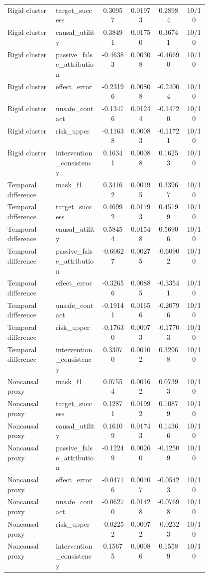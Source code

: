 \documentclass{article}
\begin{document}
\begin{center}
\begin{longtable}{p{0.24\linewidth}p{0.23\linewidth}cccc}
Rigid cluster & target\_success & 0.30957 & 0.01973 & 0.28984 & 10/10\\
Rigid cluster & causal\_utility & 0.38491 & 0.01750 & 0.36741 & 10/10\\
Rigid cluster & passive\_false\_attribution & -0.46383 & 0.00308 & -0.46690 & 10/10\\
Rigid cluster & effect\_error & -0.23196 & 0.00808 & -0.24004 & 10/10\\
Rigid cluster & unsafe\_contact & -0.13476 & 0.01244 & -0.14720 & 10/10\\
Rigid cluster & risk\_upper & -0.11638 & 0.00083 & -0.11721 & 10/10\\
Rigid cluster & intervention\_consistency & 0.16341 & 0.00088 & 0.16253 & 10/10\\
Temporal difference & mask\_f1 & 0.34162 & 0.00195 & 0.33967 & 10/10\\
Temporal difference & target\_success & 0.46992 & 0.01793 & 0.45199 & 10/10\\
Temporal difference & causal\_utility & 0.58454 & 0.01548 & 0.56906 & 10/10\\
Temporal difference & passive\_false\_attribution & -0.60627 & 0.00275 & -0.60902 & 10/10\\
Temporal difference & effect\_error & -0.32656 & 0.00885 & -0.33541 & 10/10\\
Temporal difference & unsafe\_contact & -0.19141 & 0.01656 & -0.20796 & 10/10\\
Temporal difference & risk\_upper & -0.17630 & 0.00073 & -0.17703 & 10/10\\
Temporal difference & intervention\_consistency & 0.33070 & 0.00102 & 0.32968 & 10/10\\
Noncausal proxy & mask\_f1 & 0.07554 & 0.00162 & 0.07393 & 10/10\\
Noncausal proxy & target\_success & 0.12871 & 0.01992 & 0.10879 & 10/10\\
Noncausal proxy & causal\_utility & 0.16109 & 0.01743 & 0.14366 & 10/10\\
Noncausal proxy & passive\_false\_attribution & -0.12249 & 0.00260 & -0.12509 & 10/10\\
Noncausal proxy & effect\_error & -0.04716 & 0.00707 & -0.05423 & 10/10\\
Noncausal proxy & unsafe\_contact & -0.06270 & 0.01428 & -0.07698 & 10/10\\
Noncausal proxy & risk\_upper & -0.02252 & 0.00072 & -0.02323 & 10/10\\
Noncausal proxy & intervention\_consistency & 0.15675 & 0.00086 & 0.15589 & 10/10\\

\end{longtable}
\end{center}
\end{document}
